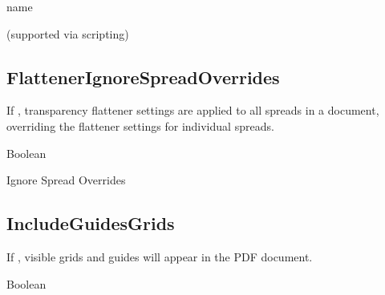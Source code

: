\documentclass[letterpaper,12pt,english,openany,oneside]{sphinxmanual}
\begin{document}
name

\label{\detokenize{PDF_Create_NewNamespaces:ui-name-29}}

 (supported via scripting)

\label{\detokenize{PDF_Create_NewNamespaces:default-value-28}}

\begin{sphinxVerbatim}[commandchars=\\\{\}]
\end{sphinxVerbatim}


\subsection{FlattenerIgnoreSpreadOverrides}
\label{\detokenize{PDF_Create_NewNamespaces:flattenerignorespreadoverrides}}
If  , transparency flattener settings are applied to all spreads in a document, overriding the flattener settings for individual spreads.

\label{\detokenize{PDF_Create_NewNamespaces:type-30}}

Boolean

\label{\detokenize{PDF_Create_NewNamespaces:ui-name-30}}

Ignore Spread Overrides

\label{\detokenize{PDF_Create_NewNamespaces:default-value-29}}

\begin{sphinxVerbatim}[commandchars=\\\{\}]
\end{sphinxVerbatim}


\subsection{IncludeGuidesGrids}
\label{\detokenize{PDF_Create_NewNamespaces:includeguidesgrids}}
If  , visible grids and guides will appear in the PDF document.

\label{\detokenize{PDF_Create_NewNamespaces:type-31}}

Boolean

\label{\detokenize{PDF_Create_NewNamespaces:ui-name-31}}
\end{document}
